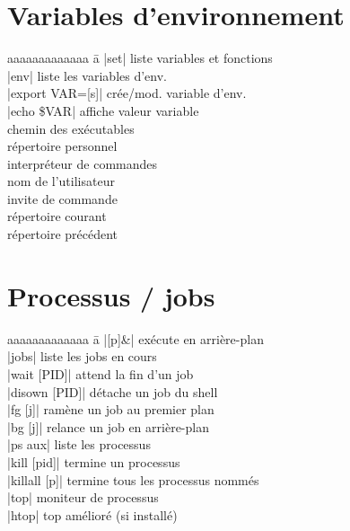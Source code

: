 \documentclass[9pt]{extarticle}
\begin{document}
\begin{multicols}{4}
    \section*{Variables d'environnement}
    \begin{tabbing}
        aaaaaaaaaaaaa \= a \kill
        \code|set| \> liste variables et fonctions \\
        \code|env| \> liste les variables d'env. \\
        \code|export VAR=[s]| \> crée/mod. variable d'env. \\
        \code|echo \$VAR| \> affiche valeur variable \\
         \> chemin des exécutables \\
         \> répertoire personnel \\
         \> interpréteur de commandes \\
         \> nom de l'utilisateur \\
         \> invite de commande \\
         \> répertoire courant \\
         \> répertoire précédent \\
    \end{tabbing}

    \section*{Processus / jobs}
    \begin{tabbing}
        aaaaaaaaaaaaa \= a \kill
        \code|[p]&| \> exécute en arrière-plan \\
        \code|jobs| \> liste les jobs en cours \\
        \code|wait [PID]| \> attend la fin d'un job \\
        \code|disown [PID]| \> détache un job du shell \\
        \code|fg [j]| \> ramène un job au premier plan \\
        \code|bg [j]| \> relance un job en arrière-plan \\
        \code|ps aux| \> liste les processus \\
        \code|kill [pid]| \> termine un processus \\
        \code|killall [p]| \> termine tous les processus nommés \\
        \code|top| \> moniteur de processus \\
        \code|htop| \> top amélioré (si installé) \\


\end{tabbing}
\end{multicols}
\end{document}
